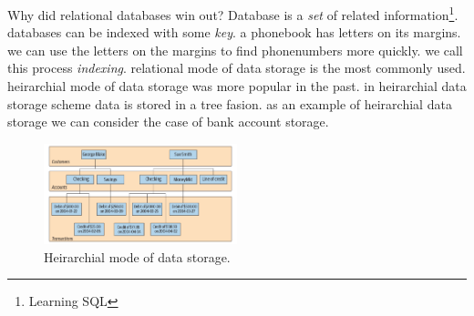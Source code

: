 \documentclass[a4paper]{article}
\begin{document}
\lstset{style=custom-sql}

Why did relational databases win out? Database is a \emph{set} of related information\footnote{Learning SQL}. databases can
be indexed with some \emph{key}. a phonebook has letters on its margins. we can use the letters on the margins to find
phonenumbers more quickly. we call this process \emph{indexing}. relational mode of data storage is the most commonly used.
heirarchial mode of data storage was more popular in the past. in heirarchial data storage scheme data is stored in a tree 
fasion. as an example of heirarchial data storage we can consider the case of bank account storage.

\begin{figure}[hbt!]
    \centering
    \includegraphics[width=0.5\textwidth]{graphics/heirarchial-database.png}
    \caption{Heirarchial mode of data storage.}
\end{figure}
\end{document}
